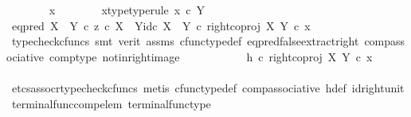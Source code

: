 \begin{isabellebody}
\ \ \ \ \ \ \isamarkupfalse%
\ x\isanewline
\ \ \ \ \ \ \isamarkupfalse%
\ x{\isacharunderscore}{\kern0pt}type{\isacharbrackleft}{\kern0pt}type{\isacharunderscore}{\kern0pt}rule{\isacharbrackright}{\kern0pt}{\isacharcolon}{\kern0pt}\ {\isachardoublequoteopen}x\ {\isasymin}\isactrlsub c\ Y{\isachardoublequoteclose}\isanewline
\ \ \ \ \ \ \isamarkupfalse%
\ {\isachardoublequoteopen}{\isacharparenleft}{\kern0pt}{\isacharparenleft}{\kern0pt}eq{\isacharunderscore}{\kern0pt}pred\ {\isacharparenleft}{\kern0pt}X\ {\isasymCoprod}\ Y{\isacharparenright}{\kern0pt}\ {\isasymcirc}\isactrlsub c\ {\isasymlangle}z\ {\isasymcirc}\isactrlsub c\ {\isasymbeta}\isactrlbsub X\ {\isasymCoprod}\ Y\isactrlesub {\isacharcomma}{\kern0pt}id\isactrlsub c\ {\isacharparenleft}{\kern0pt}X\ {\isasymCoprod}\ Y{\isacharparenright}{\kern0pt}{\isasymrangle}{\isacharparenright}{\kern0pt}\ {\isasymcirc}\isactrlsub c\ right{\isacharunderscore}{\kern0pt}coproj\ X\ Y{\isacharparenright}{\kern0pt}\ {\isasymcirc}\isactrlsub c\ x\ {\isacharequal}{\kern0pt}\ {\isasymf}{\isachardoublequoteclose}\isanewline
\ \ \ \ \ \ \ \ \isamarkupfalse%
\ {\isacharparenleft}{\kern0pt}typecheck{\isacharunderscore}{\kern0pt}cfuncs{\isacharcomma}{\kern0pt}\ smt\ {\isacharparenleft}{\kern0pt}verit{\isacharparenright}{\kern0pt}\ assms\ cfunc{\isacharunderscore}{\kern0pt}type{\isacharunderscore}{\kern0pt}def\ eq{\isacharunderscore}{\kern0pt}pred{\isacharunderscore}{\kern0pt}false{\isacharunderscore}{\kern0pt}extract{\isacharunderscore}{\kern0pt}right\ comp{\isacharunderscore}{\kern0pt}associative\ comp{\isacharunderscore}{\kern0pt}type\ not{\isacharunderscore}{\kern0pt}in{\isacharunderscore}{\kern0pt}right{\isacharunderscore}{\kern0pt}image{\isacharparenright}{\kern0pt}\isanewline
\ \ \ \ \ \ \isamarkupfalse%
\ \isamarkupfalse%
\ {\isachardoublequoteopen}{\isachardot}{\kern0pt}{\isachardot}{\kern0pt}{\isachardot}{\kern0pt}\ {\isacharequal}{\kern0pt}\ {\isacharparenleft}{\kern0pt}h\ {\isasymcirc}\isactrlsub c\ right{\isacharunderscore}{\kern0pt}coproj\ X\ Y{\isacharparenright}{\kern0pt}\ {\isasymcirc}\isactrlsub c\ x{\isachardoublequoteclose}\isanewline
\ \ \ \ \ \ \ \ \isamarkupfalse%
\ {\isacharparenleft}{\kern0pt}etcs{\isacharunderscore}{\kern0pt}assocr{\isacharcomma}{\kern0pt}typecheck{\isacharunderscore}{\kern0pt}cfuncs{\isacharcomma}{\kern0pt}\ metis\ cfunc{\isacharunderscore}{\kern0pt}type{\isacharunderscore}{\kern0pt}def\ comp{\isacharunderscore}{\kern0pt}associative\ h{\isacharunderscore}{\kern0pt}def\ id{\isacharunderscore}{\kern0pt}right{\isacharunderscore}{\kern0pt}unit{}\ terminal{\isacharunderscore}{\kern0pt}func{\isacharunderscore}{\kern0pt}comp{\isacharunderscore}{\kern0pt}elem\ terminal{\isacharunderscore}{\kern0pt}func{\isacharunderscore}{\kern0pt}type{\isacharparenright}{\kern0pt}\isanewline

\end{isabellebody}
